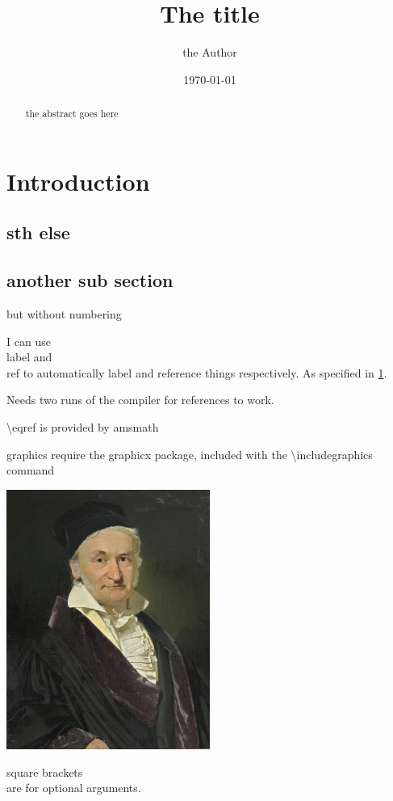 \documentclass{article}
\title{The title}
\author{the Author}
\date{\today}
\begin{document}
\maketitle


\begin{abstract}
\label{sec:abstract}
    the abstract goes here
\end{abstract}

\section{Introduction}
\label{sec:intro}


\subsection{sth else}

\subsection*{another sub section}
but without numbering

I can use \\label and \\ref to automatically label and reference things
respectively. As specified in \ref{sec:intro}.

Needs two runs of the compiler for references  to work.

\textbackslash eqref is provided by amsmath

graphics require the graphicx package, included with the \textbackslash includegraphics command

\includegraphics[width=0.5\textwidth]{gauss.jpeg}

square brackets \[ \] are for optional arguments.
\end{document}
